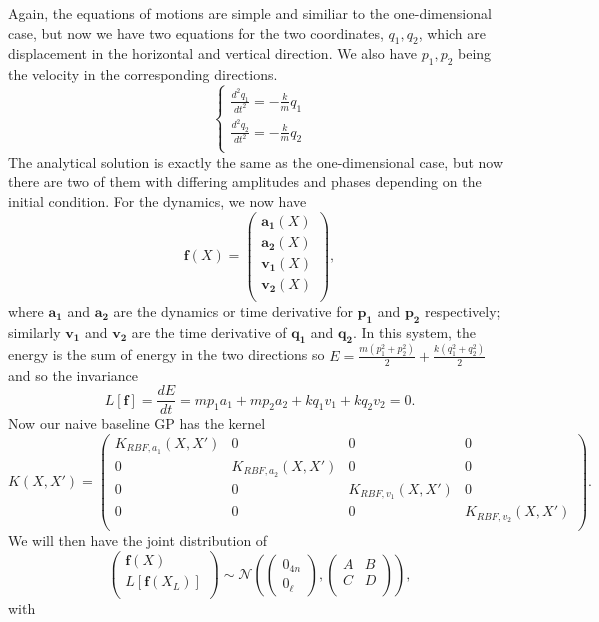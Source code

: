 \documentclass{statsmsc}
\begin{document}
Again, the equations of motions are simple and similiar to the one-dimensional case, but now we have two equations for the two coordinates, $q_1, q_2$, which are displacement in the horizontal and vertical direction.
We also have $p_1, p_2$ being the velocity in the corresponding directions.
$$
\begin{cases}
    \frac{d^2{q_1}}{dt^2} = -\frac{k}{m}q_1\\
    \frac{d^2{q_2}}{dt^2} = -\frac{k}{m}q_2\\
\end{cases}
$$
The analytical solution is exactly the same as the one-dimensional case, but now there are two of them with differing amplitudes and phases depending on the initial condition. 
For the dynamics, we now have $$\mathbf{f}(X)=\begin{pmatrix}
    \mathbf{a_1}(X)\\
    \mathbf{a_2}(X)\\
    \mathbf{v_1}(X)\\
    \mathbf{v_2}(X)\\
\end{pmatrix},$$
where $\mathbf{a_1}$ and $\mathbf{a_2}$ are the dynamics or time derivative for $\mathbf{p_1}$ and $\mathbf{p_2}$ respectively; similarly $\mathbf{v_1}$ and $\mathbf{v_2}$ are the time derivative of $\mathbf{q_1}$ and $\mathbf{q_2}$.
In this system, the energy is the sum of energy in the two directions so $E=\frac{m(p_1^2+p_2^2)}{2}+\frac{k(q_1^2+q_2^2)}{2}$ and so the invariance $$L[\mathbf{f}]=\frac{dE}{dt}=mp_1a_1+mp_2a_2+kq_1v_1+kq_2v_2=0.$$
Now our naive baseline GP has the kernel
$$
K(X,X')=\begin{pmatrix}
K_{RBF,a_1}(X,X') & 0 & 0 & 0 \\
0 & K_{RBF,a_2}(X,X') & 0 & 0 \\
0 & 0 & K_{RBF,v_1}(X,X') & 0 \\
0 & 0 & 0 & K_{RBF,v_2}(X,X') \\
\end{pmatrix}.
$$
We will then have the joint distribution of
$$
\begin{pmatrix}
    \mathbf{f}(X)\\L[\mathbf{f}(X_L)]\\
\end{pmatrix}
\sim\mathcal{N}
\left(
\begin{pmatrix}
    0_{4n} \\ 0_{\ell}
\end{pmatrix},
\begin{pmatrix}
    A & B \\
    C & D\\
\end{pmatrix}
\right),
$$
with 
\end{document}
